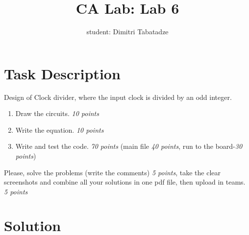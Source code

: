 \documentclass{article}
\title{CA Lab: Lab 6}
\author{student: Dimitri Tabatadze}
\newcommand{\points}[1]{{\footnotesize{\color{red}\textit{#1 points}}}}
\begin{document}
    \maketitle

    \section*{Task Description} 
    
    Design of Clock divider, where the input clock is divided by an odd integer.

    \begin{enumerate}
        \item Draw the circuits. \points{10}
        \item Write the equation. \points{10}
        \item Write and test the code. \points{70} (main file \points{40}, run to the board-\points{30})
    \end{enumerate}

    Please, solve the problems (write the comments) \points{5}, take the clear screenshots and combine all your solutions in one pdf file, then upload in teams. \points{5}

    \section*{Solution}
\end{document}
